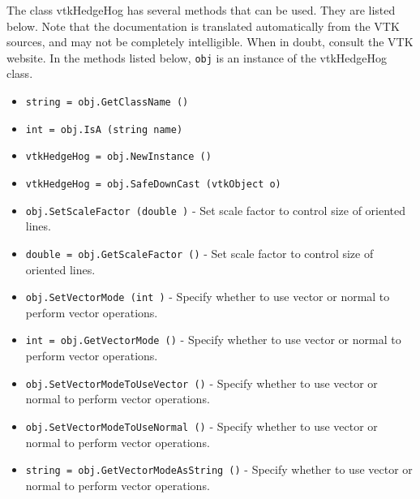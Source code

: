 The class vtkHedgeHog has several methods that can be used.
  They are listed below.
Note that the documentation is translated automatically from the VTK sources,
and may not be completely intelligible.  When in doubt, consult the VTK website.
In the methods listed below, \verb|obj| is an instance of the vtkHedgeHog class.
\begin{itemize}
\item  \verb|string = obj.GetClassName ()|

\item  \verb|int = obj.IsA (string name)|

\item  \verb|vtkHedgeHog = obj.NewInstance ()|

\item  \verb|vtkHedgeHog = obj.SafeDownCast (vtkObject o)|

\item  \verb|obj.SetScaleFactor (double )| -  Set scale factor to control size of oriented lines.

\item  \verb|double = obj.GetScaleFactor ()| -  Set scale factor to control size of oriented lines.

\item  \verb|obj.SetVectorMode (int )| -  Specify whether to use vector or normal to perform vector operations.

\item  \verb|int = obj.GetVectorMode ()| -  Specify whether to use vector or normal to perform vector operations.

\item  \verb|obj.SetVectorModeToUseVector ()| -  Specify whether to use vector or normal to perform vector operations.

\item  \verb|obj.SetVectorModeToUseNormal ()| -  Specify whether to use vector or normal to perform vector operations.

\item  \verb|string = obj.GetVectorModeAsString ()| -  Specify whether to use vector or normal to perform vector operations.

\end{itemize}
